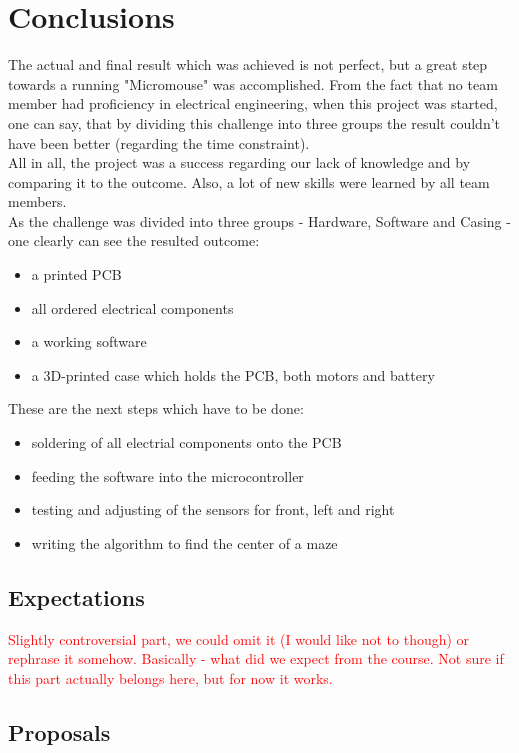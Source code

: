 \section{Conclusions}

The actual and final result which was achieved is not perfect, but a great step towards a running "Micromouse" was accomplished. From the fact that no team member had proficiency in electrical engineering, when this project was started, one can say, that by dividing this challenge into three groups the result couldn't have been better (regarding the time constraint). \\
All in all, the project was a success regarding our lack of knowledge and by comparing it to the outcome. Also, a lot of new skills were learned by all team members.\\

\noindent
As the challenge was divided into three groups - Hardware, Software and Casing - one clearly can see the resulted outcome:
\begin{itemize}
    \item a printed PCB
    \item all ordered electrical components
    \item a working software
    \item a 3D-printed case which holds the PCB, both motors and battery\\
\end{itemize}

\noindent
These are the next steps which have to be done:
\begin{itemize}
    \item soldering of all electrial components onto the PCB
    \item feeding the software into the microcontroller
    \item testing and adjusting of the sensors for front, left and right
    \item writing the algorithm to find the center of a maze
\end{itemize}

\subsection{Expectations}
\textcolor{red}{
Slightly controversial part, we could omit it (I would like not to though) or rephrase it somehow. Basically - what did we expect from the course. Not sure if this part actually belongs here, but for now it works.
}
\subsection{Proposals}

